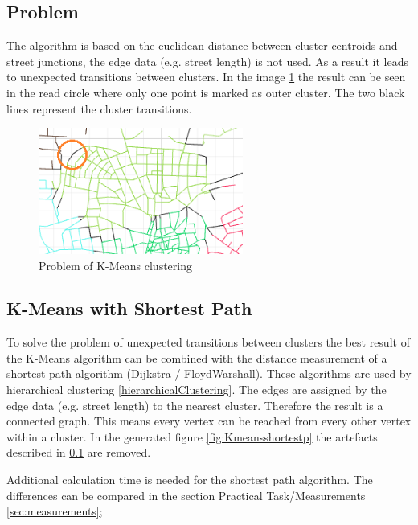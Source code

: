 \documentclass[11pt, a4paper]{report}
\begin{document}
\subsection{Problem} \label{kmenasProblem}
The algorithm is based on the euclidean distance between cluster centroids and street junctions, the edge data (e.g. street length) is not used. As a result it leads to unexpected transitions between clusters. In the image \ref{fig:KmeansProblem} the result can be seen in the read circle where only one point is marked as outer cluster. The two black lines represent the cluster transitions.
\begin{figure}[!h]
    \centering
    \includegraphics[width=0.6\textwidth]{clusteranalysis_kmeans_problem.png}
    \caption{Problem of K-Means clustering\label{fig:KmeansProblem}}
\end{figure}

\subsection{K-Means with Shortest Path}
To solve the problem of unexpected transitions between clusters the best result of the K-Means algorithm can be combined with the distance measurement of a shortest path algorithm (Dijkstra / FloydWarshall). These algorithms are used by hierarchical clustering \ref{hierarchicalClustering}. The edges are assigned by the edge data (e.g. street length) to the nearest cluster. Therefore the result is a connected graph. This means every vertex can be reached from every other vertex within a cluster. In the generated figure \ref{fig:Kmeansshortestp} the artefacts described in \ref{kmenasProblem} are removed.

Additional calculation time is needed for the shortest path algorithm. The differences can be compared in the section Practical Task/Measurements \ref{sec:measurements};
\end{document}
